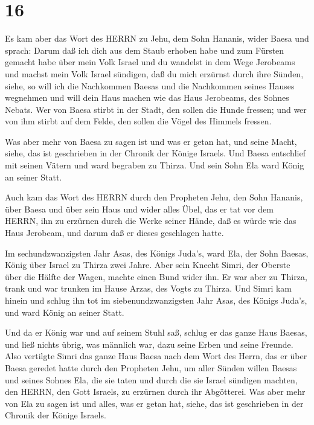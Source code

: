 \hypertarget{section-15}{%
\section{16}\label{section-15}}

 Es kam aber das Wort des HERRN zu Jehu, dem Sohn Hananis,
wider Baesa und sprach:  Darum daß ich dich aus dem Staub
erhoben habe und zum Fürsten gemacht habe über mein Volk Israel und du
wandelst in dem Wege Jerobeams und machst mein Volk Israel sündigen, daß
du mich erzürnst durch ihre Sünden,  siehe, so will ich die
Nachkommen Baesas und die Nachkommen seines Hauses wegnehmen und will
dein Haus machen wie das Haus Jerobeams, des Sohnes Nebats. 
Wer von Baesa stirbt in der Stadt, den sollen die Hunde fressen; und wer
von ihm stirbt auf dem Felde, den sollen die Vögel des Himmels fressen.

 Was aber mehr von Baesa zu sagen ist und was er getan hat,
und seine Macht, siehe, das ist geschrieben in der Chronik der Könige
Israels.  Und Baesa entschlief mit seinen Vätern und ward
begraben zu Thirza. Und sein Sohn Ela ward König an seiner Statt.

 Auch kam das Wort des HERRN durch den Propheten Jehu, den
Sohn Hananis, über Baesa und über sein Haus und wider alles Übel, das er
tat vor dem HERRN, ihn zu erzürnen durch die Werke seiner Hände, daß es
würde wie das Haus Jerobeam, und darum daß er dieses geschlagen hatte.

 Im sechundzwanzigsten Jahr Asas, des Königs Juda's, ward
Ela, der Sohn Baesas, König über Israel zu Thirza zwei Jahre.
 Aber sein Knecht Simri, der Oberste über die Hälfte der
Wagen, machte einen Bund wider ihn. Er war aber zu Thirza, trank und war
trunken im Hause Arzas, des Vogts zu Thirza.  Und Simri kam
hinein und schlug ihn tot im siebenundzwanzigsten Jahr Asas, des Königs
Juda's, und ward König an seiner Statt.

 Und da er König war und auf seinem Stuhl saß, schlug er
das ganze Haus Baesas, und ließ nichts übrig, was männlich war, dazu
seine Erben und seine Freunde.  Also vertilgte Simri das
ganze Haus Baesa nach dem Wort des Herrn, das er über Baesa geredet
hatte durch den Propheten Jehu,  um aller Sünden willen
Baesas und seines Sohnes Ela, die sie taten und durch die sie Israel
sündigen machten, den HERRN, den Gott Israels, zu erzürnen durch ihr
Abgötterei.  Was aber mehr von Ela zu sagen ist und alles,
was er getan hat, siehe, das ist geschrieben in der Chronik der Könige
Israels.

